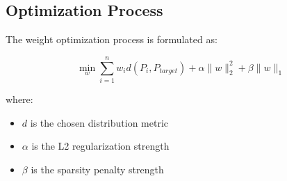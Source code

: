 \subsection{Optimization Process}
The weight optimization process is formulated as:

\begin{equation}
    \min_w \sum_{i=1}^{n} w_i d(P_i, P_{target}) + \alpha \|w\|_2^2 + \beta \|w\|_1
\end{equation}

where:
\begin{itemize}
    \item $d$ is the chosen distribution metric
    \item $\alpha$ is the L2 regularization strength
    \item $\beta$ is the sparsity penalty strength
\end{itemize} 